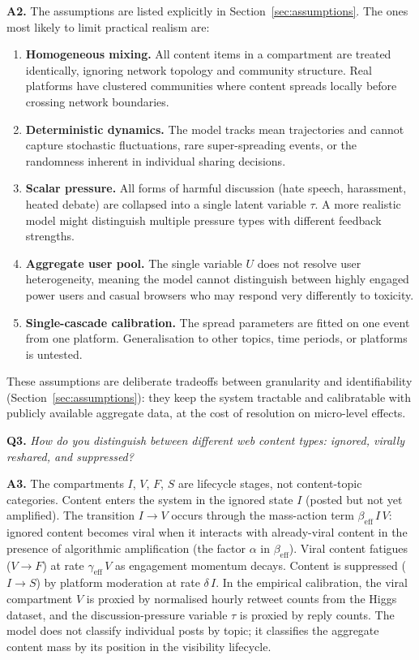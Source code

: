 \documentclass[11pt]{article}
\begin{document}
\medskip
\noindent\textbf{A2.}
The assumptions are listed explicitly in Section~\ref{sec:assumptions}. The ones most likely to limit practical realism are:
\begin{enumerate}[leftmargin=1.5em]
  \item \textbf{Homogeneous mixing.} All content items in a compartment are treated identically, ignoring network topology and community structure. Real platforms have clustered communities where content spreads locally before crossing network boundaries.
  \item \textbf{Deterministic dynamics.} The model tracks mean trajectories and cannot capture stochastic fluctuations, rare super-spreading events, or the randomness inherent in individual sharing decisions.
  \item \textbf{Scalar pressure.} All forms of harmful discussion (hate speech, harassment, heated debate) are collapsed into a single latent variable $\tau$. A more realistic model might distinguish multiple pressure types with different feedback strengths.
  \item \textbf{Aggregate user pool.} The single variable $U$ does not resolve user heterogeneity, meaning the model cannot distinguish between highly engaged power users and casual browsers who may respond very differently to toxicity.
  \item \textbf{Single-cascade calibration.} The spread parameters are fitted on one event from one platform. Generalisation to other topics, time periods, or platforms is untested.
\end{enumerate}
These assumptions are deliberate tradeoffs between granularity and identifiability (Section~\ref{sec:assumptions}): they keep the system tractable and calibratable with publicly available aggregate data, at the cost of resolution on micro-level effects.

\bigskip

\noindent\textbf{Q3.} \textit{How do you distinguish between different web content types: ignored, virally reshared, and suppressed?}

\medskip
\noindent\textbf{A3.}
The compartments $I$, $V$, $F$, $S$ are lifecycle stages, not content-topic categories.
Content enters the system in the ignored state $I$ (posted but not yet amplified).
The transition $I \to V$ occurs through the mass-action term $\beta_{\mathrm{eff}}\,I\,V$: ignored content becomes viral when it interacts with already-viral content in the presence of algorithmic amplification (the factor $\alpha$ in $\beta_{\mathrm{eff}}$).
Viral content fatigues ($V \to F$) at rate $\gamma_{\mathrm{eff}}\,V$ as engagement momentum decays.
Content is suppressed ($I \to S$) by platform moderation at rate $\delta\,I$.
In the empirical calibration, the viral compartment $V$ is proxied by normalised hourly retweet counts from the Higgs dataset, and the discussion-pressure variable $\tau$ is proxied by reply counts.
The model does not classify individual posts by topic; it classifies the aggregate content mass by its position in the visibility lifecycle.
\end{document}
